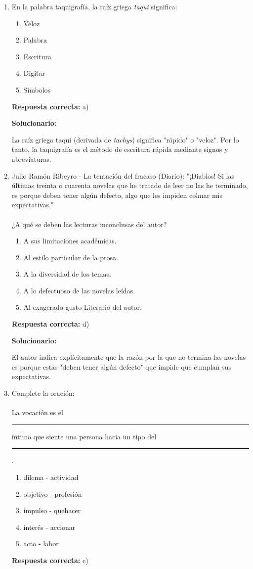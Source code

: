 \begin{enumerate}[resume]
	\item En la palabra taquigrafía, la raíz griega \textit{taqui} significa:
	\begin{enumerate}[label=\alph*)]
		\item Veloz
		\item Palabra
		\item Escritura
		\item Digitar
		\item Símbolos
	\end{enumerate}
	\textbf{Respuesta correcta:} a)

	\vspace{2mm}
	\textbf{Solucionario:}

	La raíz griega taqui (derivada de \textit{tachys}) significa "rápido" o "veloz". Por lo tanto, la taquigrafía es el método de escritura rápida mediante signos y abreviaturas.

	\vspace{6mm}

	\item Julio Ramón Ribeyro - La tentación del fracaso (Diario): "¡Diablos! Si las últimas treinta o cuarenta novelas que he tratado de leer no las he terminado, es porque deben tener algún defecto, algo que les impiden colmar mis expectativas."\\
	\\
	¿A qué se deben las lecturas inconclusas del autor?
	\begin{enumerate}[label=\alph*)]
		\item A sus limitaciones académicas.
		\item Al estilo particular de la prosa.
		\item A la diversidad de los temas.
		\item A lo defectuoso de las novelas leídas.
		\item Al exagerado gusto Literario del autor.
	\end{enumerate}
	\textbf{Respuesta correcta:} d)

	\vspace{2mm}
	\textbf{Solucionario:}

	El autor indica explícitamente que la razón por la que no termina las novelas es porque estas "deben tener algún defecto" que impide que cumplan sus expectativas.

	\vspace{6mm}

	\item Complete la oración:\\
	\\
	La vocación es el \rule{2cm}{0.4pt} íntimo que siente una persona hacia un tipo del \rule{2cm}{0.4pt}.
	\begin{enumerate}[label=\alph*)]
		\item dilema - actividad
		\item objetivo - profesión
		\item impulso - quehacer
		\item interés - accionar
		\item acto - labor
	\end{enumerate}
	\textbf{Respuesta correcta:} c)


\end{enumerate}
